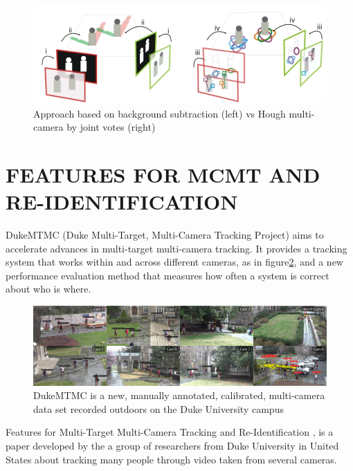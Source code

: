 \documentclass[journal, a4paper]{IEEEtran}
\begin{document}
\begin{figure}[ht] \centering
\includegraphics[scale=0.25]{images/hough.jpg}   
\caption{\label{fig:hough} Approach based on background subtraction (left) vs Hough multi-camera by joint votes \cite{sternig2011multi} (right)}
\end{figure}

\section{FEATURES FOR MCMT AND RE-IDENTIFICATION}
\label{sec:MTMC_ReID}
DukeMTMC (Duke Multi-Target, Multi-Camera Tracking Project) aims to accelerate advances in multi-target multi-camera tracking. It provides a tracking system that works within and across different cameras, as in figure\ref{fig:duke}, and a new performance evaluation method that measures how often a system is correct about who is where. \\

\begin{figure}[ht] \centering
\includegraphics[scale=0.08]{images/duke.jpg}   
\caption{\label{fig:duke} DukeMTMC is a new, manually annotated, calibrated, multi-camera data set recorded outdoors on the Duke University campus \cite{dukeImg}}
\end{figure}

Features for Multi-Target Multi-Camera Tracking and Re-Identification \cite{MTMCReID}, is a paper developed by the a group of researchers from Duke University in United States about tracking many people through video taken from several cameras.\\
\end{document}
